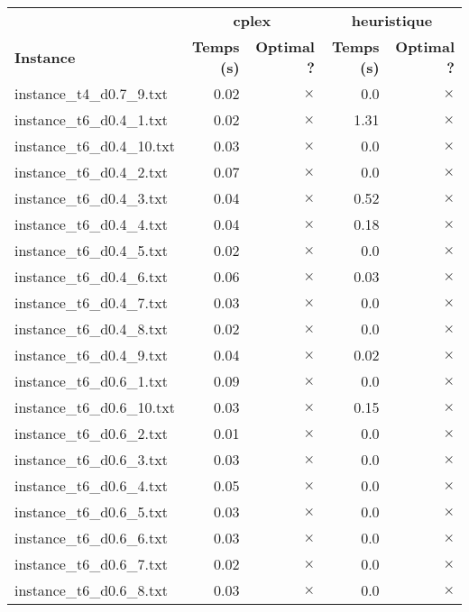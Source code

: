 \documentclass{article}
\begin{document}
\newpage
\begin{center}
\renewcommand{\arraystretch}{1.4}
 \begin{tabular}{lrrrr}
	\hline
 & \multicolumn{2}{c}{\textbf{cplex}} & \multicolumn{2}{c}{\textbf{heuristique}}\\
\textbf{Instance}  & \textbf{Temps (s)} & \textbf{Optimal ?}  & \textbf{Temps (s)} & \textbf{Optimal ?} \\\hline

instance\_t4\_d0.7\_9.txt & 0.02 & 
$\times$
 & 0.0 & 
$\times$
\\
instance\_t6\_d0.4\_1.txt & 0.02 & 
$\times$
 & 1.31 & 
$\times$
\\
instance\_t6\_d0.4\_10.txt & 0.03 & 
$\times$
 & 0.0 & 
$\times$
\\
instance\_t6\_d0.4\_2.txt & 0.07 & 
$\times$
 & 0.0 & 
$\times$
\\
instance\_t6\_d0.4\_3.txt & 0.04 & 
$\times$
 & 0.52 & 
$\times$
\\
instance\_t6\_d0.4\_4.txt & 0.04 & 
$\times$
 & 0.18 & 
$\times$
\\
instance\_t6\_d0.4\_5.txt & 0.02 & 
$\times$
 & 0.0 & 
$\times$
\\
instance\_t6\_d0.4\_6.txt & 0.06 & 
$\times$
 & 0.03 & 
$\times$
\\
instance\_t6\_d0.4\_7.txt & 0.03 & 
$\times$
 & 0.0 & 
$\times$
\\
instance\_t6\_d0.4\_8.txt & 0.02 & 
$\times$
 & 0.0 & 
$\times$
\\
instance\_t6\_d0.4\_9.txt & 0.04 & 
$\times$
 & 0.02 & 
$\times$
\\
instance\_t6\_d0.6\_1.txt & 0.09 & 
$\times$
 & 0.0 & 
$\times$
\\
instance\_t6\_d0.6\_10.txt & 0.03 & 
$\times$
 & 0.15 & 
$\times$
\\
instance\_t6\_d0.6\_2.txt & 0.01 & 
$\times$
 & 0.0 & 
$\times$
\\
instance\_t6\_d0.6\_3.txt & 0.03 & 
$\times$
 & 0.0 & 
$\times$
\\
instance\_t6\_d0.6\_4.txt & 0.05 & 
$\times$
 & 0.0 & 
$\times$
\\
instance\_t6\_d0.6\_5.txt & 0.03 & 
$\times$
 & 0.0 & 
$\times$
\\
instance\_t6\_d0.6\_6.txt & 0.03 & 
$\times$
 & 0.0 & 
$\times$
\\
instance\_t6\_d0.6\_7.txt & 0.02 & 
$\times$
 & 0.0 & 
$\times$
\\
instance\_t6\_d0.6\_8.txt & 0.03 & 
$\times$
 & 0.0 & 
$\times$
\\

\end{tabular}
\end{center}
\end{document}
